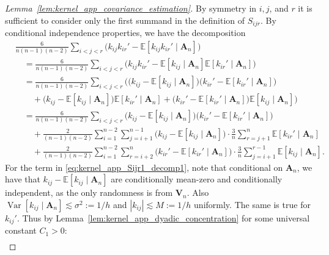 \documentclass[11pt,lof]{puthesis}
\newcommand{\E}{\ensuremath{\mathbb{E}}}
\newcommand{\bA}{\ensuremath{\mathbf{A}}}
\newcommand{\bV}{\ensuremath{\mathbf{V}}}
\DeclareMathOperator{\Var}{Var}
\theoremstyle{break}
\theoremstyle{proof}
\newtheorem{proof}{Proof}
\begin{document}
\begin{proof}[Lemma~\ref{lem:kernel_app_covariance_estimation}]
  By symmetry in $i, j$, and $r$
  it is sufficient to consider only the first summand
  in the definition of $S_{i j r}$.
  By conditional independence properties,
  we have the decomposition
  \begin{align}
    \nonumber
    &\frac{6}{n(n-1)(n-2)}
    \sum_{i<j<r}
    \Big(
      k_{i j}k_{i r}'
      - \E[k_{i j}k_{i r}' \mid \bA_n]
    \Big) \\
    \nonumber
    &\quad=
    \frac{6}{n(n-1)(n-2)}
    \sum_{i<j<r}
    \Big(
      k_{i j}k_{i r}'
      - \E[k_{i j} \mid \bA_n]
      \E[k_{i r}' \mid \bA_n]
    \Big) \\
    \nonumber
    &\quad=
    \frac{6}{n(n-1)(n-2)}
    \sum_{i<j<r}
    \Big(
      \big(
        k_{i j}
        - \E[k_{i j} \mid \bA_n]
      \big)
      \big(
        k_{i r}'
        - \E[k_{i r}' \mid \bA_n]
      \big) \\
      \nonumber
      &\qquad+
      \big(
        k_{i j}
        - \E[k_{i j} \mid \bA_n]
      \big)
      \E[k_{i r}' \mid \bA_n]
      + \big(
        k_{i r}'
        - \E[k_{i r}' \mid \bA_n]
      \big)
      \E[k_{i j} \mid \bA_n]
    \Big) \\
    \label{eq:kernel_app_Sijr1_decomp1}
    &\quad=
    \frac{6}{n(n-1)(n-2)}
    \sum_{i<j<r}
    \Big(
      k_{i j}
      - \E[k_{i j} \mid \bA_n]
    \Big)
    \Big(
      k_{i r}'
      - \E[k_{i r}' \mid \bA_n]
    \Big) \\
    \label{eq:kernel_app_Sijr1_decomp2}
    &\qquad+
    \frac{2}{(n-1)(n-2)}
    \sum_{i=1}^{n-2}
    \sum_{j=i+1}^{n-1}
    \Big(
      k_{i j}
      - \E[k_{i j} \mid \bA_n]
    \Big)
    \cdot \frac{3}{n}
    \sum_{r=j+1}^n
    \E[k_{i r}' \mid \bA_n] \\
    \label{eq:kernel_app_Sijr1_decomp3}
    &\qquad+
    \frac{2}{(n-1)(n-2)}
    \sum_{i=1}^{n-2}
    \sum_{r=i+2}^n
    \Big(
      k_{i r}'
      - \E[k_{i r}' \mid \bA_n]
    \Big)
    \cdot \frac{3}{n}
    \sum_{j=i+1}^{r-1}
    \E[k_{i j} \mid \bA_n].
  \end{align}
  For the term in \eqref{eq:kernel_app_Sijr1_decomp1},
  note that conditional on $\bA_n$,
  we have that
  $k_{i j} - \E[k_{i j} \mid \bA_n]$
  are conditionally mean-zero
  and conditionally independent,
  as the only randomness is from $\bV_n$.
  Also $\Var[k_{i j} \mid \bA_n] \lesssim \sigma^2 := 1/h$ and $|k_{i j}|
  \lesssim M := 1/h$ uniformly.
  The same is true for $k_{i j}'$.
  Thus by Lemma~\ref{lem:kernel_app_dyadic_concentration}
  for some universal constant $C_1 > 0$:
  \begin{align*}

\end{align*}
\end{proof}
\end{document}
